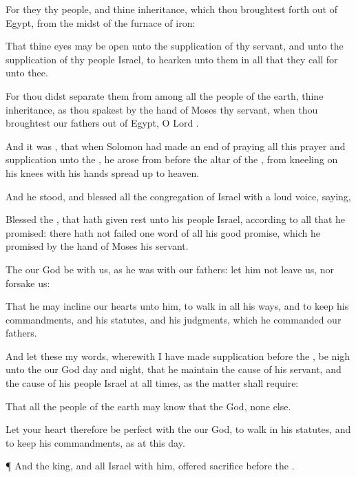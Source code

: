 {For they
{} thy
people, and thine
inheritance, which thou broughtest
forth out of
Egypt, from the
midst of the
furnace of
iron:

That thine
eyes may be
open unto the
supplication of thy
servant, and unto the
supplication of thy
people
Israel, to
hearken unto them in all that they
call for unto thee.

For thou didst
separate them from among all the
people of the
earth,
{} thine
inheritance, as thou
spakest by the
hand of
Moses thy
servant, when thou
broughtest our
fathers out of
Egypt, O
Lord
{}.


\par }{\PP {}And it was
{}, that when
Solomon had made an
end of
praying all this
prayer and
supplication unto the
{}, he
arose from
before the
altar of the
{}, from
kneeling on his
knees with his
hands spread
up to
heaven.

And he
stood, and
blessed all the
congregation of
Israel with a
loud
voice,
saying,

Blessed
{} the
{}, that hath
given
rest unto his
people
Israel, according to all that he
promised: there hath not
failed
one
word of all his
good
promise, which he
promised by the
hand of
Moses his
servant.

The
{} our
God be with us, as he was with our
fathers: let him not
leave us, nor
forsake us:

That he may
incline our
hearts unto him, to
walk in all his
ways, and to
keep his
commandments, and his
statutes, and his
judgments, which he
commanded our
fathers.

And let these my
words, wherewith I have made
supplication
before the
{}, be
nigh unto the
{} our
God
day and
night, that he
maintain the
cause of his
servant, and the
cause of his
people
Israel at all
times, as the
matter shall require:

That all the
people of the
earth may
know that the
{}
{}
God,
{} none else.

Let your
heart therefore be
perfect with the
{} our
God, to
walk in his
statutes, and to
keep his
commandments, as at this
day.


\par }{\PP {}¶ And the
king, and all
Israel with him,
offered
sacrifice
before the
{}.

}
